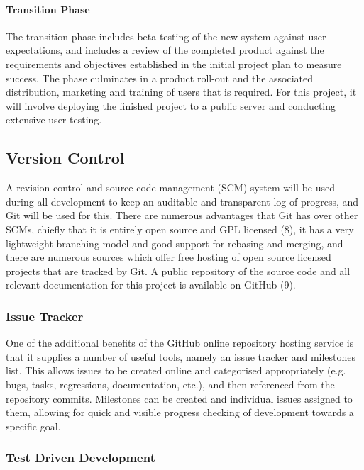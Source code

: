 \documentclass[12pt,a4paper]{article}
\begin{document}
\paragraph{Transition Phase} The transition phase includes beta testing of the
new system against user expectations, and includes a review of the completed
product against the requirements and objectives established in the initial
project plan to measure success. The phase culminates in a product roll-out and
the associated distribution, marketing and training of users that is
required. For this project, it will involve deploying the finished project to a
public server and conducting extensive user testing.

\subsection{Version Control}

A revision control and source code management (SCM) system will be used during
all development to keep an auditable and transparent log of progress, and Git
will be used for this. There are numerous advantages that Git has over other
SCMs, chiefly that it is entirely open source and GPL licensed (8), it has a
very lightweight branching model and good support for rebasing and merging, and
there are numerous sources which offer free hosting of open source licensed
projects that are tracked by Git. A public repository of the source code and all
relevant documentation for this project is available on GitHub (9).

\subsubsection{Issue Tracker}

One of the additional benefits of the GitHub online repository hosting service
is that it supplies a number of useful tools, namely an issue tracker and
milestones list. This allows issues to be created online and categorised
appropriately (e.g. bugs, tasks, regressions, documentation, etc.), and then
referenced from the repository commits.  Milestones can be created and
individual issues assigned to them, allowing for quick and visible progress
checking of development towards a specific goal.

\subsubsection{Test Driven Development}
\end{document}
